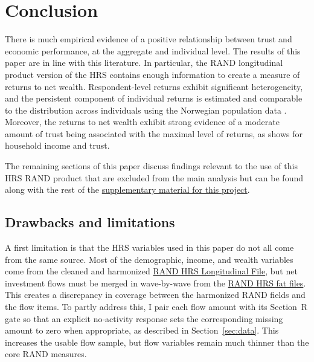 \onlyinsubfile{\setcounter{section}{5}}
\section{Conclusion}
\label{sec:concl}

\par There is much empirical evidence of a positive relationship between trust and economic performance, at the aggregate and individual level. The results of this paper are in line with this literature. In particular, the RAND longitudinal product version of the HRS contains enough information to create a measure of returns to net wealth. Respondent-level returns exhibit significant heterogeneity, and the persistent component of individual returns is estimated and comparable to the distribution across individuals using the Norwegian population data  \cite{aflgdmlp20}. Moreover, the returns to net wealth exhibit strong evidence of a moderate amount of trust being associated with the maximal level of returns, as \cite{jbpglg2016} shows for household income and trust.

\par The remaining sections of this paper discuss findings relevant to the use of this HRS RAND product that are excluded from the main analysis but can be found along with the rest of the \href{https://github.com/dedwar65/Chp2-TrustandReturns/tree/main/Supplementary}{supplementary material for this project}.

\subsection{Drawbacks and limitations}

\par A first limitation is that the HRS variables used in this paper do not all come from the same source. Most of the demographic, income, and wealth variables come from the cleaned and harmonized \href{https://hrs.isr.umich.edu/news/data-announcements/rand-hrs-longitudinal-file-2018-v1}{RAND HRS Longitudinal File}, but net investment flows must be merged in wave-by-wave from the \href{https://hrsdata.isr.umich.edu/data-products/rand}{RAND HRS fat files}. This creates a discrepancy in coverage between the harmonized RAND fields and the flow items. To partly address this, I pair each flow amount with its Section~R gate so that an explicit no-activity response sets the corresponding missing amount to zero when appropriate, as described in Section~\ref{sec:data}. This increases the usable flow sample, but flow variables remain much thinner than the core RAND measures.


